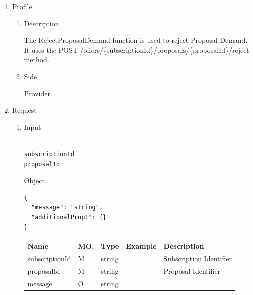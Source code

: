 \begin{enumerate}

\item Profile

\begin{enumerate}

\item Description

The RejectProposalDemand function is used to reject Proposal Demand. \\
It uses the POST /offers/\{subscriptionId\}/proposals/\{proposalId\}/reject method.

\item Side

Provider

\end{enumerate}

\item Request

\begin{enumerate}

\item Input

\begin{tcolorbox}[boxrule=0pt, frame empty]
\begin{verbatim}

subscriptionId
proposalId

\end{verbatim}
\end{tcolorbox}

Object
\begin{tcolorbox}[boxrule=0pt, frame empty]
\begin{verbatim}
{
  "message": "string",
  "additionalProp1": {}
}
\end{verbatim}
\end{tcolorbox}

\begin{center}
\begin{tabular}{|p{3cm}|l|p{3cm}|p{3cm}|p{4cm}|} 
\hline
\rowcolor{lightgray}	Name	& MO.	& Type	& Example & 	Description \\
\hline

subscriptionId		& M	& 	string			&		&	Subscription Identifier \\ 

\hline

proposalId			& M & 	string			&		&	Proposal Identifier \\

\hline	

message				& O &	string 			&		& 		\\


\end{tabular}
\end{center}
\end{enumerate}
\end{enumerate}
